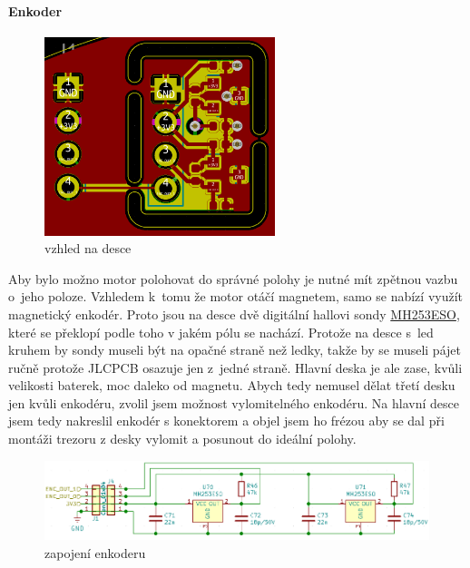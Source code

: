 \newpage

\paragraph{Enkoder}

\begin{figure}
    \centering
    \includegraphics[width= 0.6\textwidth]{kapitoly/obrazky/E4/ir_motor_enkoder/pcb-enc.png}
    \caption{\label{fig:E4-enkoder_pcb}vzhled na desce}
\end{figure}
Aby bylo možno motor polohovat do správné polohy je nutné mít zpětnou vazbu o~jeho poloze. Vzhledem k~tomu že motor otáčí magnetem, samo se nabízí využít magnetický enkodér. 
Proto jsou na desce dvě digitální hallovi sondy \href{https://datasheet.lcsc.com/szlcsc/Magnesensor-Tech-MST-MH253ESO_C114369.pdf}{MH253ESO}, které se překlopí podle toho v jakém pólu 
se nachází. Protože na desce s~led kruhem by sondy museli být na opačné straně než ledky, takže by se museli pájet ručně protože JLCPCB osazuje jen z~jedné straně. Hlavní deska je ale zase, 
kvůli velikosti baterek, moc daleko od magnetu. Abych tedy nemusel dělat třetí desku jen kvůli enkodéru, zvolil jsem možnost vylomitelného enkodéru. Na hlavní desce jsem tedy nakreslil 
enkodér s konektorem a objel jsem ho frézou aby se dal při montáži trezoru z desky vylomit a posunout do ideální polohy.

\begin{figure}[htbp]
    \centering
    \includegraphics[width=\textwidth]{kapitoly/obrazky/E4/ir_motor_enkoder/enc.png}
    \caption{zapojení enkoderu}
    \label{fig:E4-enkoder}
\end{figure}
